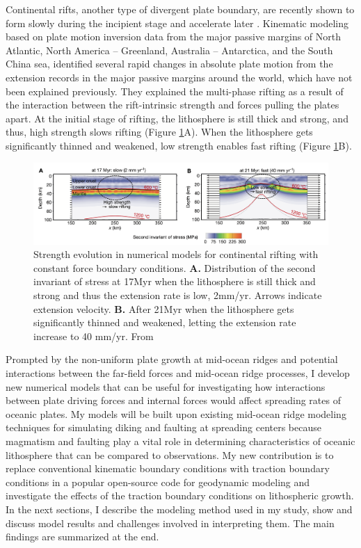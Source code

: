 \documentclass[letterpaper,12pt,notitle]{memphisthesis}                     %
\begin{document}
Continental rifts, another type of divergent plate boundary, are recently shown to form slowly during the incipient stage and accelerate later \citep{Brune2016}. Kinematic modeling based on plate motion inversion data from the major passive margins of North Atlantic, North America – Greenland, Australia – Antarctica, and the South China sea, \citet{Brune2016} identified several rapid changes in absolute plate motion from the extension records in the major passive margins around the world, which have not been explained previously. They explained the multi-phase rifting as a result of the interaction between the rift-intrinsic strength and forces pulling the plates apart. At the initial stage of rifting, the lithosphere is still thick and strong, and thus, high strength slows rifting (Figure \ref{fig:brune}A). When the lithosphere gets significantly thinned and weakened, low strength enables fast rifting (Figure \ref{fig:brune}B).
%
\begin{figure}[!htb]
	\centering
	\includegraphics[width=0.99\linewidth,trim=4 4 4 4,clip]{./figs/brune.png}
	\caption{Strength evolution in numerical models for continental rifting with constant force boundary conditions. \textbf{A.} Distribution of the second invariant of stress at 17Myr when the lithosphere is still thick and strong and thus the extension rate is low, 2mm/yr. Arrows indicate extension velocity. \textbf{B.} After 21Myr when the lithosphere gets significantly thinned and weakened, letting the extension rate increase to 40 mm/yr. From \citet{Brune2016}}
	\label{fig:brune}
\end{figure}

Prompted by the non-uniform plate growth at mid-ocean ridges and potential interactions between the far-field forces and mid-ocean ridge processes, I develop new numerical models that can be useful for investigating how interactions between plate driving forces and internal forces would affect spreading rates of oceanic plates. My models will be built upon existing mid-ocean ridge modeling techniques for simulating diking and faulting at spreading centers because magmatism and faulting play a vital role in determining characteristics of oceanic lithosphere that can be compared to observations. My new contribution is to replace conventional kinematic boundary conditions with traction boundary conditions in a popular open-source code for geodynamic modeling and investigate the effects of the traction boundary conditions on lithospheric growth. In the next sections, I describe the modeling method used in my study, show and discuss model results and challenges involved in interpreting them. The main findings are summarized at the end.
\end{document}
